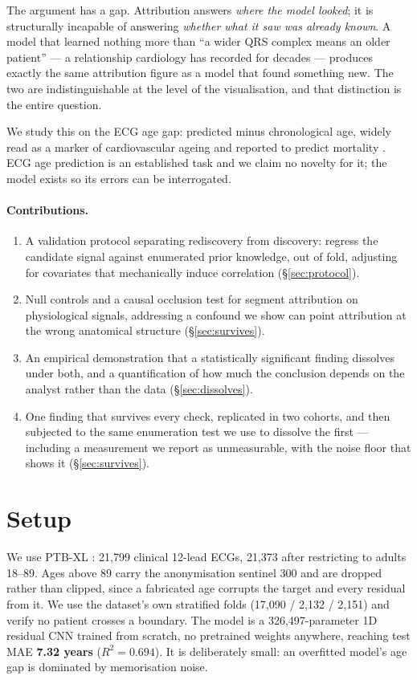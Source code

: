\documentclass{article}
\begin{document}
The argument has a gap. Attribution answers \emph{where the model looked}; it is
structurally incapable of answering \emph{whether what it saw was already known}.
A model that learned nothing more than ``a wider QRS complex means an older
patient'' --- a relationship cardiology has recorded for decades --- produces
exactly the same attribution figure as a model that found something new. The two
are indistinguishable at the level of the visualisation, and that distinction is
the entire question.

We study this on the ECG age gap: predicted minus chronological age, widely read
as a marker of cardiovascular ageing and reported to predict mortality
\citep{lima2021ecgage}. ECG age prediction is an established task
\citep{attia2019age} and we claim no novelty for it; the model exists so its
errors can be interrogated.

\paragraph{Contributions.}
\begin{enumerate}\itemsep2pt
\item A validation protocol separating rediscovery from discovery: regress the
candidate signal against enumerated prior knowledge, out of fold, adjusting for
covariates that mechanically induce correlation (\S\ref{sec:protocol}).
\item Null controls and a causal occlusion test for segment attribution on
physiological signals, addressing a confound we show can point attribution at
the wrong anatomical structure (\S\ref{sec:survives}).
\item An empirical demonstration that a statistically significant finding
dissolves under both, and a quantification of how much the conclusion depends on
the analyst rather than the data (\S\ref{sec:dissolves}).
\item One finding that survives every check, replicated in two cohorts, and then
subjected to the same enumeration test we use to dissolve the first --- including
a measurement we report as unmeasurable, with the noise floor that shows it
(\S\ref{sec:survives}).
\end{enumerate}

\section{Setup}
\label{sec:setup}

We use PTB-XL \citep{wagner2020ptbxl}: 21{,}799 clinical 12-lead ECGs, 21{,}373
after restricting to adults 18--89. Ages above 89 carry the anonymisation
sentinel 300 and are dropped rather than clipped, since a fabricated age
corrupts the target and every residual from it. We use the dataset's own
stratified folds (17{,}090 / 2{,}132 / 2{,}151) and verify no patient crosses a
boundary. The model is a 326{,}497-parameter 1D residual CNN trained from
scratch, no pretrained weights anywhere, reaching test MAE \textbf{7.32 years}
($R^2 = 0.694$). It is deliberately small: an overfitted model's age gap is
dominated by memorisation noise.
\end{document}
